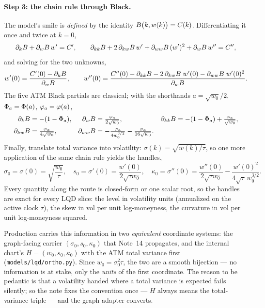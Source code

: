 \documentclass[11pt]{article}
\begin{document}
\paragraph{Step 3: the chain rule through Black.}  The model's smile is
\emph{defined} by the identity $B\big(k,w(k)\big)=C(k)$.
Differentiating it once and twice at $k=0$,
\[
\partial_kB+\partial_wB\,w'=C',
\qquad
\partial_{kk}B+2\,\partial_{kw}B\,w'
+\partial_{ww}B\,(w')^{2}+\partial_wB\,w''=C'',
\]
and solving for the two unknowns,
\begin{equation}
w'(0)=\frac{C'(0)-\partial_kB}{\partial_wB},
\qquad
w''(0)=\frac{C''(0)-\partial_{kk}B
-2\,\partial_{kw}B\;w'(0)-\partial_{ww}B\;w'(0)^{2}}
{\partial_wB}.
\label{eq:w_derivs}
\end{equation}
The five ATM Black partials are classical; with the shorthands
$a=\sqrt{w_0}/2$, $\Phi_a=\Phi(a)$, $\varphi_a=\varphi(a)$,
\begin{equation}
\begin{aligned}
\partial_kB&=-(1-\Phi_a), &
\partial_wB&=\tfrac{\varphi_a}{2\sqrt{w_0}}, &
\partial_{kk}B&=-(1-\Phi_a)+\tfrac{\varphi_a}{\sqrt{w_0}},\\
\partial_{kw}B&=\tfrac{\varphi_a}{4\sqrt{w_0}}, &
\partial_{ww}B&=-\tfrac{\varphi_a}{4w_0^{3/2}}-\tfrac{\varphi_a}{16\sqrt{w_0}}. & &
\end{aligned}
\label{eq:black_partials}
\end{equation}
Finally, translate total variance into volatility: $\sigma(k)=\sqrt{w(k)/\tau}$,
so one more application of the same chain rule yields the handles,
\begin{equation}
\sigma_0=\sigma(0)=\sqrt{\frac{w_0}{\tau}},
\quad
s_0=\sigma'(0)=\frac{w'(0)}{2\sqrt{\tau w_0}},
\quad
\kappa_0=\sigma''(0)=\frac{w''(0)}{2\sqrt{\tau w_0}}
-\frac{w'(0)^{2}}{4\sqrt{\tau}\,w_0^{3/2}}.
\label{eq:atm_handles}
\end{equation}
Every quantity along the route is closed-form or one scalar root, so the
handles are exact for every LQD slice: the level in volatility units
(annualized on the active clock $\tau$), the skew in vol per unit
log-moneyness, the curvature in vol per unit log-moneyness squared.

\begin{remark}
Production carries this information in two \emph{equivalent} coordinate
systems: the graph-facing carrier $(\sigma_0,s_0,\kappa_0)$ that Note~14
propagates, and the internal chart's $H=(w_0,s_0,\kappa_0)$ with the ATM
total variance first (\texttt{models/lqd/ortho.py}).  Since
$w_0=\sigma_0^{2}\tau$, the two are a smooth bijection --- no information is
at stake, only the \emph{units} of the first coordinate.  The reason to be
pedantic is that a volatility handed where a total variance is expected
fails silently; so the note fixes the convention once --- $H$ always means
the total-variance triple --- and the graph adapter converts.
\end{remark}
\end{document}
